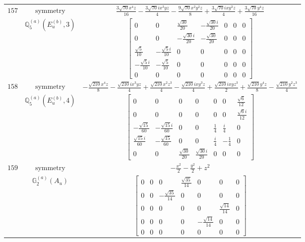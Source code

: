 \documentclass[fleqn,8pt,landscape]{jsarticle}
\begin{document}
\begin{longtable}{ccc}
$ 157 $ & $ \text{symmetry} $ & $ \frac{3 \sqrt{70} x^{4} z}{16} - \frac{3 \sqrt{70} i x^{3} y z}{4} - \frac{9 \sqrt{70} x^{2} y^{2} z}{8} + \frac{3 \sqrt{70} i x y^{3} z}{4} + \frac{3 \sqrt{70} y^{4} z}{16} $ \\
$  $ & $ \mathbb{Q}_{5}^{(a)}(E_{u}^{(b)},3) $ & $ \begin{bmatrix} 0 & 0 & \frac{\sqrt{30}}{20} & - \frac{\sqrt{30} i}{20} & 0 & 0 & 0 \\ 0 & 0 & - \frac{\sqrt{30} i}{20} & - \frac{\sqrt{30}}{20} & 0 & 0 & 0 \\ \frac{\sqrt{5}}{10} & - \frac{\sqrt{5} i}{10} & 0 & 0 & 0 & 0 & 0 \\ - \frac{\sqrt{5} i}{10} & - \frac{\sqrt{5}}{10} & 0 & 0 & 0 & 0 & 0 \\ 0 & 0 & 0 & 0 & 0 & 0 & 0 \end{bmatrix} $ \\ \hline
$ 158 $ & $ \text{symmetry} $ & $ - \frac{\sqrt{210} x^{4} z}{8} - \frac{\sqrt{210} i x^{3} y z}{4} + \frac{\sqrt{210} x^{2} z^{3}}{4} - \frac{\sqrt{210} i x y^{3} z}{4} + \frac{\sqrt{210} i x y z^{3}}{2} + \frac{\sqrt{210} y^{4} z}{8} - \frac{\sqrt{210} y^{2} z^{3}}{4} $ \\
$  $ & $ \mathbb{Q}_{5}^{(a)}(E_{u}^{(b)},4) $ & $ \begin{bmatrix} 0 & 0 & 0 & 0 & 0 & 0 & \frac{\sqrt{6}}{12} \\ 0 & 0 & 0 & 0 & 0 & 0 & \frac{\sqrt{6} i}{12} \\ - \frac{\sqrt{15}}{60} & - \frac{\sqrt{15} i}{60} & 0 & 0 & \frac{1}{4} & \frac{i}{4} & 0 \\ \frac{\sqrt{15} i}{60} & - \frac{\sqrt{15}}{60} & 0 & 0 & \frac{i}{4} & - \frac{1}{4} & 0 \\ 0 & 0 & \frac{\sqrt{30}}{20} & \frac{\sqrt{30} i}{20} & 0 & 0 & 0 \end{bmatrix} $ \\ \hline
$ 159 $ & $ \text{symmetry} $ & $ - \frac{x^{2}}{2} - \frac{y^{2}}{2} + z^{2} $ \\
$  $ & $ \mathbb{G}_{2}^{(a)}(A_{u}) $ & $ \begin{bmatrix} 0 & 0 & 0 & \frac{\sqrt{35}}{14} & 0 & 0 & 0 \\ 0 & 0 & - \frac{\sqrt{35}}{14} & 0 & 0 & 0 & 0 \\ 0 & 0 & 0 & 0 & 0 & \frac{\sqrt{14}}{14} & 0 \\ 0 & 0 & 0 & 0 & - \frac{\sqrt{14}}{14} & 0 & 0 \\ 0 & 0 & 0 & 0 & 0 & 0 & 0 \end{bmatrix} $ \\ \hline

\end{longtable}
\end{document}
